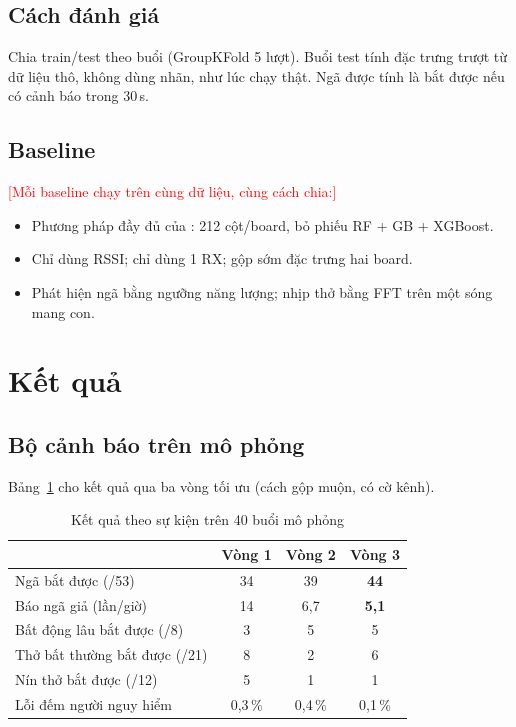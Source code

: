\documentclass[conference]{IEEEtran}
\newcommand{\canlam}[1]{\textcolor{red}{[#1]}}
\begin{document}
\subsection{Cách đánh giá}
Chia train/test theo buổi (GroupKFold 5 lượt). Buổi test tính đặc trưng trượt từ dữ liệu thô, không dùng nhãn, như lúc
chạy thật. Ngã được tính là bắt được nếu có cảnh báo trong 30\,s.

\subsection{Baseline}
\canlam{Mỗi baseline chạy trên cùng dữ liệu, cùng cách chia:}
\begin{itemize}
  \item Phương pháp đầy đủ của \cite{natarajan2023}: 212 cột/board, bỏ phiếu RF + GB + XGBoost.
  \item Chỉ dùng RSSI; chỉ dùng 1 RX; gộp sớm đặc trưng hai board.
  \item Phát hiện ngã bằng ngưỡng năng lượng; nhịp thở bằng FFT trên một sóng mang con.
\end{itemize}

\section{Kết quả}
\subsection{Bộ cảnh báo trên mô phỏng}
Bảng~\ref{tab:vong} cho kết quả qua ba vòng tối ưu (cách gộp muộn, có cờ kênh).

\begin{table}[t]
\caption{Kết quả theo sự kiện trên 40 buổi mô phỏng}
\label{tab:vong}
\centering\small
\begin{tabular}{@{}lccc@{}}
\toprule
 & Vòng 1 & Vòng 2 & Vòng 3 \\
\midrule
Ngã bắt được (/53) & 34 & 39 & \textbf{44} \\
Báo ngã giả (lần/giờ) & 14 & 6,7 & \textbf{5,1} \\
Bất động lâu bắt được (/8) & 3 & 5 & 5 \\
Thở bất thường bắt được (/21) & 8 & 2 & 6 \\
Nín thở bắt được (/12) & 5 & 1 & 1 \\
Lỗi đếm người nguy hiểm & 0,3\,\% & 0,4\,\% & 0,1\,\% \\
\bottomrule
\end{tabular}
\end{table}
\end{document}
